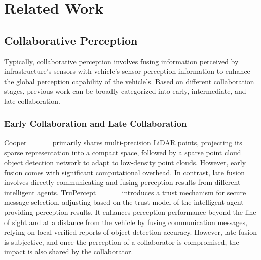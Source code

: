 \section{Related Work}
\subsection{Collaborative Perception}
 Typically, collaborative perception involves fusing information perceived by infrastructure's sensors with vehicle's sensor perception information to enhance the global perception capability of the vehicle's. Based on different collaboration stages, previous work can be broadly categorized into early, intermediate, and late collaboration.
\subsubsection{Early Collaboration and Late Collaboration}
Cooper ____ primarily shares multi-precision LiDAR points, projecting its sparse representation into a compact space, followed by a sparse point cloud object detection network to adapt to low-density point clouds. However, early fusion comes with significant computational overhead. In contrast, late fusion involves directly communicating and fusing perception results from different intelligent agents. TruPercept ____ introduces a trust mechanism for secure message selection, adjusting based on the trust model of the intelligent agent providing perception results. It enhances perception performance beyond the line of sight and at a distance from the vehicle by fusing communication messages, relying on local-verified reports of object detection accuracy. However, late fusion is subjective, and once the perception of a collaborator is compromised, the impact is also shared by the collaborator.

